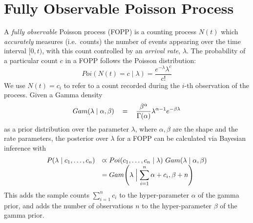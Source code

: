 
\section{Fully Observable Poisson Process}
\label{sec:preliminaries}

A \emph{fully observable} Poisson process (FOPP) is a counting process $N(t)$ which \emph{accurately} measures (i.e.~counts) the number of events appearing over the time interval $[0, t)$, with this count controlled by an \textit{arrival rate}, $\lambda$. The probability of a particular count $c$ in a FOPP follows the Poisson distribution:
\begin{equation}
    \label{eq:pmf_poisson}
	Poi(N(t) = c \mid \lambda) = \frac{e ^{-\lambda} \lambda ^{c}}{c!}
\end{equation}
We use $N(t) = c_i$ to refer to a count recorded during the $i$-th observation of the process.
Given a Gamma density
\begin{equation}
    \label{eq:pdf_gamma}
    \begin{tabular}{rcl}
        $Gam(\lambda \mid \alpha, \beta)$ & = & $\displaystyle\frac{\beta ^{\alpha}}{\Gamma (\alpha)} \lambda ^{\alpha - 1} e^{-\beta \lambda}$ \\ [1ex]
    \end{tabular}
\end{equation}
as a prior distribution over the parameter $\lambda$, where $\alpha, \beta$ are the shape and the rate parameters, the posterior over $\lambda$ for a FOPP can be  calculated via Bayesian inference with
\begin{equation}
    \label{eq:posterior_fopp}
    \begin{array}{lll}
        P(\lambda \mid c_1, \ldots, c_n) & \varpropto Poi(c_1, \ldots, c_n \mid \lambda) ~ Gam(\lambda \mid \alpha, \beta) \\
         & = Gam \Bigg(\lambda \Bigm| \displaystyle\sum_{i=1}^{n} \alpha + c_i, \beta + n \Bigg)
    \end{array}
\end{equation}
This adds the sample counts $\sum_{i=1}^{n} c_i$ to the hyper-parameter $\alpha$ of the gamma prior, and adds the number of observations $n$ to the hyper-parameter $\beta$ of the gamma prior.
